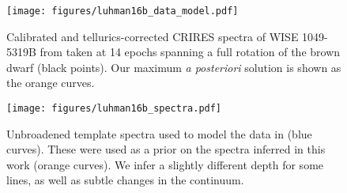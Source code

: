 \documentclass[modern]{aastex631}
\begin{document}
\begin{figure}[p!]
    \begin{centering}
        \texttt{[image: figures/luhman16b\_data\_model.pdf]} %
        \caption{%
            Calibrated and tellurics-corrected CRIRES spectra of WISE 1049-5319B from \citet{Crossfield2014} taken at 14 epochs spanning a full rotation of the brown dwarf (black points).
            Our maximum \emph{a posteriori} solution is shown as the orange curves.
        }
        \label{fig:luhman16b:data_model}
    \end{centering}
\end{figure}
%
\begin{figure}[p!]
    \begin{centering}
        \texttt{[image: figures/luhman16b\_spectra.pdf]} %
        \caption{%
            Unbroadened template spectra used to model the data in \citet{Crossfield2014} (blue curves). 
            These were used as a prior on the spectra inferred in this work (orange curves). 
            We infer a slightly different depth for some lines, as well as subtle changes in the continuum.
        }
        \label{fig:luhman16b:template_spectra}
    \end{centering}
\end{figure}
\end{document}
